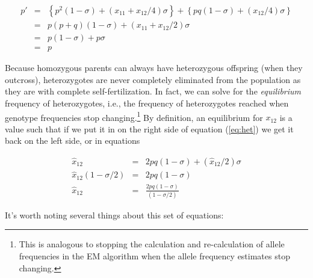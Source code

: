 \begin{eqnarray}
p' &=& \left\{p^2(1-\sigma) + (x_{11} + x_{12}/4)\sigma\right\}
       + \left\{pq(1-\sigma) + (x_{12}/4)\sigma\right\} \\
   &=& p(p+q)(1-\sigma) + (x_{11} + x_{12}/2)\sigma \\
   &=& p(1-\sigma) + p\sigma \\
   &=& p
\end{eqnarray}

Because homozygous parents can always have heterozygous offspring
(when they outcross), heterozygotes are never completely eliminated
from the population as they are with complete self-fertilization. In
fact, we can solve for the {\it equilibrium} frequency of
heterozygotes, i.e., the frequency of heterozygotes reached when
genotype frequencies stop changing.\footnote{This is analogous to
  stopping the calculation and re-calculation of allele frequencies in
  the EM algorithm when the allele frequency estimates stop changing.}
By definition, an equilibrium for $x_{12}$ is a value such that if we
put it in on the right side of equation (\ref{eq:het}) we get it back
on the left side, or in equations

\begin{eqnarray}
\hat x_{12} &=& 2pq(1-\sigma) + (\hat x_{12}/2)\sigma \\
\hat x_{12}(1 - \sigma/2) &=& 2pq(1-\sigma) \\
\hat x_{12} &=& \frac{2pq(1-\sigma)}{(1-\sigma/2)}
\end{eqnarray}

\noindent It's worth noting several things about this set of
equations:

